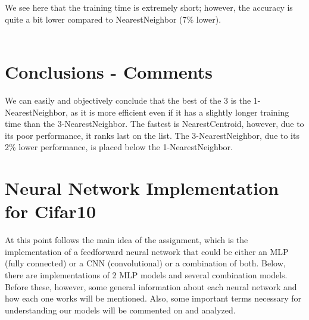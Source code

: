 \documentclass[11pt, letterpaper]{article}
\begin{document}
We see here that the training time is extremely short; however, the accuracy is quite a bit lower compared to NearestNeighbor (7\% lower). \\ \\

\section*{Conclusions - Comments}
We can easily and objectively conclude that the best of the 3 is the 1-NearestNeighbor, as it is more efficient even if it has a slightly longer training time than the 3-NearestNeighbor. The fastest is NearestCentroid, however, due to its poor performance, it ranks last on the list. The 3-NearestNeighbor, due to its 2\% lower performance, is placed below the 1-NearestNeighbor.

\newpage

\section*{Neural Network Implementation for Cifar10}
At this point follows the main idea of the assignment, which is the implementation of a feedforward neural network that could be either an MLP (fully connected) or a CNN (convolutional) or a combination of both. Below, there are implementations of 2 MLP models and several combination models. Before these, however, some general information about each neural network and how each one works will be mentioned. Also, some important terms necessary for understanding our models will be commented on and analyzed.  \\ \\ \\ 
\end{document}
